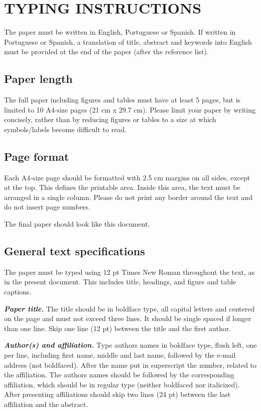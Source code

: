 \documentclass[12pt,fleqn]{article}
\begin{document}
\section{TYPING INSTRUCTIONS}
The paper must be written in English, Portuguese or Spanish. If written in Portuguese or Spanish, a translation of title, abstract and keywords into English must be provided at the end of the paper (after the reference list).

\subsection{Paper length}
The full paper including figures and tables must have at least 5 pages, but is limited to 10 A4-size pages (21 cm x 29.7 cm). Please limit your paper by writing concisely, rather than by reducing figures or tables to a size at which symbols/labels become difficult to read.

\subsection{Page format}
Each A4-size page should be formatted with 2.5 cm margins on all sides, except at the top. This defines the printable area. Inside this area, the text must be arranged in a single column. Please do not print any border around the text and do not insert page numbers.

The final paper should look like this document.

\subsection{General text specifications}

The paper must be typed using 12 pt Times New Roman throughout the text, as in the present document. This includes title, headings, and figure and table captions.

\vspace{0.5cm} %

\textbf{\textit{Paper title.}} The title should be in boldface type, all capital letters and centered on the page and must not exceed three lines. It should be single spaced if longer than one line. Skip one line (12 pt) between the title and the first author.

\vspace{0.5cm} %

\textbf{\textit{Author(s) and affiliation.}} Type authors names in boldface type, flush left, one per line, including first name, middle and last name, followed by the e-mail address (not boldfaced). After the name put in superscript the number, related to the affiliation. The authors names should be followed by the corresponding affiliation, which should be in regular type (neither boldfaced nor italicized). After presenting affiliations should skip two lines (24 pt) between the last affiliation and the abstract.
\end{document}
